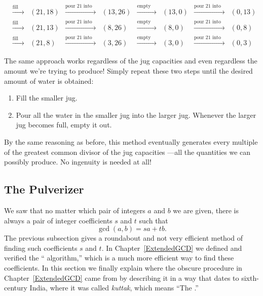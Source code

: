 \[\begin{array}{ccccccccc}
& \xrightarrow{\text{fill 21}} & (21,18)& \xrightarrow{\text{pour 21 into 26}} & (13,26)& \xrightarrow{\text{empty 26}} & (13,0)& \xrightarrow{\text{pour 21 into 26}} & (0,13)\\
& \xrightarrow{\text{fill 21}} & (21,13)& \xrightarrow{\text{pour 21 into 26}} & (8,26)& \xrightarrow{\text{empty 26}} & (8,0)& \xrightarrow{\text{pour 21 into 26}} & (0,8)\\
& \xrightarrow{\text{fill 21}} & (21,8)& \xrightarrow{\text{pour 21 into 26}} & (3,26)& \xrightarrow{\text{empty 26}} & (3,0)& \xrightarrow{\text{pour 21 into 26}} & (0,3)
\end{array}
\]
%

The same approach works regardless of the jug capacities and even
regardless the amount we're trying to produce!  Simply repeat these two
steps until the desired amount of water is obtained:
\begin{enumerate}
\item Fill the smaller jug.
\item Pour all the water in the smaller jug into the larger jug.
Whenever the larger jug becomes full, empty it out.
\end{enumerate}

By the same reasoning as before, this method eventually generates every
multiple of the greatest common divisor of the jug capacities ---all the
quantities we can possibly produce.  No ingenuity is needed at all!


\subsection{The Pulverizer}
\label{sec:pulverizer}

We saw that no matter which pair of integers $a$ and $b$ we
are given, there is always a pair of integer coefficients $s$ and $t$
such that     
\[
\gcd(a, b)  =  s a + t b.
\]
The previous subsection gives a roundabout and not very efficient
method of finding such coefficients $s$ and $t$.  In
Chapter~\ref{ExtendedGCD} we defined and verified the `` algorithm,'' which is a much more efficient way to find
these coefficients.  In this section we finally explain where the
obscure procedure in Chapter~\ref{ExtendedGCD} came from by describing
it in a way that dates to sixth-century India, where it was called
\emph{kuttak}, which means ``The .''

